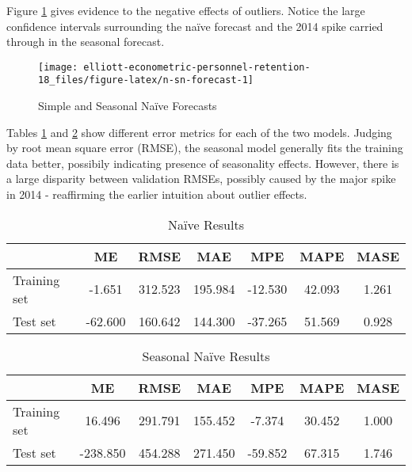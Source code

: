 \documentclass[12pt,letterpaper,toc=flat,oneside]{report}
\theoremstyle{definition}
\theoremstyle{definition}
\theoremstyle{definition}
\theoremstyle{remark}
\begin{document}
Figure \ref{fig:n-sn-forecast} gives evidence to the negative effects of
outliers. Notice the large confidence intervals surrounding the naïve
forecast and the 2014 spike carried through in the seasonal forecast.

\begin{figure}[H]

{\centering \texttt{[image: elliott-econometric-personnel-retention-18\_files/figure-latex/n-sn-forecast-1]} 

}

\caption{Simple and Seasonal Na\"ive Forecasts}\label{fig:n-sn-forecast}
\end{figure}

Tables \ref{tab:n-err} and \ref{tab:sn-err} show different error metrics
for each of the two models. Judging by root mean square error (RMSE),
the seasonal model generally fits the training data better, possibily
indicating presence of seasonality effects. However, there is a large
disparity between validation RMSEs, possibly caused by the major spike
in 2014 - reaffirming the earlier intuition about outlier effects.

\begin{table}[!h]

\caption{\label{tab:n-err}Na\"ive Results}
\centering
\begin{tabular}[t]{lcccccc}
\toprule
\bfseries{ } & \bfseries{ME} & \bfseries{RMSE} & \bfseries{MAE} & \bfseries{MPE} & \bfseries{MAPE} & \bfseries{MASE}\\
\midrule
Training set & -1.651 & 312.523 & 195.984 & -12.530 & 42.093 & 1.261\\
Test set & -62.600 & 160.642 & 144.300 & -37.265 & 51.569 & 0.928\\
\bottomrule
\end{tabular}
\end{table}\begin{table}[!h]

\caption{\label{tab:sn-err}Seasonal Na\"ive Results}
\centering
\begin{tabular}[t]{lcccccc}
\toprule
\bfseries{ } & \bfseries{ME} & \bfseries{RMSE} & \bfseries{MAE} & \bfseries{MPE} & \bfseries{MAPE} & \bfseries{MASE}\\
\midrule
Training set & 16.496 & 291.791 & 155.452 & -7.374 & 30.452 & 1.000\\
Test set & -238.850 & 454.288 & 271.450 & -59.852 & 67.315 & 1.746\\
\bottomrule
\end{tabular}
\end{table}
\end{document}
